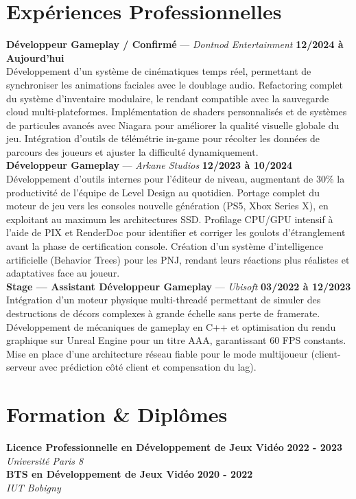 \documentclass[11pt,a4paper]{article}
\begin{document}
\section*{Expériences Professionnelles}
\noindent \textbf{Développeur Gameplay / Confirmé} --- \textit{Dontnod Entertainment} \hfill \textbf{12/2024 à Aujourd'hui} \\
Développement d'un système de cinématiques temps réel, permettant de synchroniser les animations faciales avec le doublage audio. Refactoring complet du système d'inventaire modulaire, le rendant compatible avec la sauvegarde cloud multi-plateformes. Implémentation de shaders personnalisés et de systèmes de particules avancés avec Niagara pour améliorer la qualité visuelle globale du jeu. Intégration d'outils de télémétrie in-game pour récolter les données de parcours des joueurs et ajuster la difficulté dynamiquement. \\[0.3cm]
\noindent \textbf{Développeur Gameplay} --- \textit{Arkane Studios} \hfill \textbf{12/2023 à 10/2024} \\
Développement d'outils internes pour l'éditeur de niveau, augmentant de 30\% la productivité de l'équipe de Level Design au quotidien. Portage complet du moteur de jeu vers les consoles nouvelle génération (PS5, Xbox Series X), en exploitant au maximum les architectures SSD. Profilage CPU/GPU intensif à l'aide de PIX et RenderDoc pour identifier et corriger les goulots d'étranglement avant la phase de certification console. Création d'un système d'intelligence artificielle (Behavior Trees) pour les PNJ, rendant leurs réactions plus réalistes et adaptatives face au joueur. \\[0.3cm]
\noindent \textbf{Stage — Assistant Développeur Gameplay} --- \textit{Ubisoft} \hfill \textbf{03/2022 à 12/2023} \\
Intégration d'un moteur physique multi-threadé permettant de simuler des destructions de décors complexes à grande échelle sans perte de framerate. Développement de mécaniques de gameplay en C++ et optimisation du rendu graphique sur Unreal Engine pour un titre AAA, garantissant 60 FPS constants. Mise en place d'une architecture réseau fiable pour le mode multijoueur (client-serveur avec prédiction côté client et compensation du lag). \\[0.3cm]


\vspace{0.3cm}

\section*{Formation \& Diplômes}
\noindent \textbf{Licence Professionnelle en Développement de Jeux Vidéo} \hfill \textbf{2022 - 2023} \\
\textit{Université Paris 8} \\[0.3cm]
\noindent \textbf{BTS en Développement de Jeux Vidéo} \hfill \textbf{2020 - 2022} \\
\textit{IUT Bobigny} \\[0.3cm]
\end{document}

